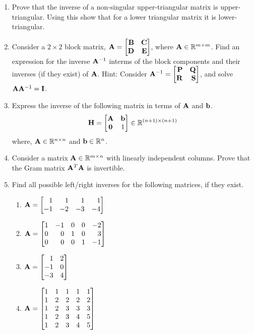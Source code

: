 \documentclass[9pt]{article}
\def\mf{\ensuremath\mathbf}
\def\mb{\ensuremath\mathbb}
\def\bmx{\ensuremath\begin{bmatrix*}[r]}
\def\emx{\ensuremath\end{bmatrix*}}
\begin{document}
\begin{multicols}{2}
\begin{enumerate}[resume]
    \item Prove that the inverse of a non-singular upper-triangular matrix is upper-triangular. Using this show that for a lower triangular matrix it is lower-triangular.

    \item Consider a $2 \times 2$ block matrix, $\mf{A} = \bmx \mf{B} & \mf{C}\\\mf{D} & \mf{E}\emx$, where $\mf{A} \in \mb{R}^{m \times m}$. Find an expression for the inverse $\mf{A}^{-1}$ interms of the block components and their inverses (if they exist) of $\mf{A}$. Hint: Consider $\mf{A}^{-1} = \bmx \mf{P} & \mf{Q}\\ \mf{R} & \mf{S}\emx$, and solve $\mf{A}\mf{A}^{-1} = \mf{I}$.

    \item Express the inverse of the following matrix in terms of $\mf{A}$ and $\mf{b}$. 
    \[ \mf{H} = \begin{bmatrix*}
    \mf{A} & \mf{b}\\
    \mathbf{0} & 1\\
    \end{bmatrix*} \in \mathbb{R}^{\left(n+1\right) \times \left(n+1\right)}
    \]
    where, $\mf{A} \in \mathbb{R}^{n \times n}$ and $\mf{b} \in \mathbb{R}^n$. 

    \item Consider a matrix $\mf{A} \in \mathbb{R}^{m \times n}$ with linearly independent columns. Prove that the Gram matrix $\mf{A}^T\mf{A}$ is invertible.
    
    \item Find all possible left/right inverses for the following matrices, if they exist.
    \begin{enumerate}
        \item $\mf{A} = \bmx 1 & 1 & 1 & 1\\ -1 & -2 & -3 & -4\emx$
        \item $\mf{A} = \bmx 1 & -1 & 0 & 0 & -2\\ 0 & 0 & 1 & 0 & 3\\0 & 0 & 0 & 1 & -1\emx$
        \item $\mf{A} = \bmx 1 & 2\\-1 & 0\\-3 & 4\emx$
        \item $\mf{A} = \bmx 1 & 1 & 1 & 1 & 1\\
        1 & 2 & 2 & 2 & 2\\
        1 & 2 & 3 & 3 & 3\\
        1 & 2 & 3 & 4 & 5\\
        1 & 2 & 3 & 4 & 5
        \emx$
    \end{enumerate}
    

\end{enumerate}
\end{multicols}
\end{document}
